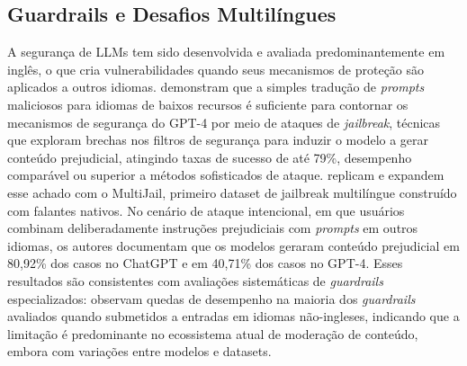 \subsection{Guardrails e Desafios Multilíngues}
A segurança de LLMs tem sido desenvolvida e avaliada predominantemente em inglês, o que cria vulnerabilidades quando seus mecanismos de proteção são aplicados a outros idiomas.  demonstram que a simples tradução de \textit{prompts} maliciosos para idiomas de baixos recursos é suficiente para contornar os mecanismos de segurança do GPT-4 por meio de ataques de \textit{jailbreak}, técnicas que exploram brechas nos filtros de segurança para induzir o modelo a gerar conteúdo prejudicial, atingindo taxas de sucesso de até 79\%, desempenho comparável ou superior a métodos sofisticados de ataque.  replicam e expandem esse achado com o MultiJail, primeiro dataset de jailbreak multilíngue construído com falantes nativos. No cenário de ataque intencional, em que usuários combinam deliberadamente instruções prejudiciais com \textit{prompts} em outros idiomas, os autores documentam que os modelos geraram conteúdo prejudicial em 80,92\% dos casos no ChatGPT e em 40,71\% dos casos no GPT-4. Esses resultados são consistentes com avaliações sistemáticas de \textit{guardrails} especializados:  observam quedas de desempenho na maioria dos \textit{guardrails} avaliados quando submetidos a entradas em idiomas não-ingleses, indicando que a limitação é predominante no ecossistema atual de moderação de conteúdo, embora com variações entre modelos e datasets.

